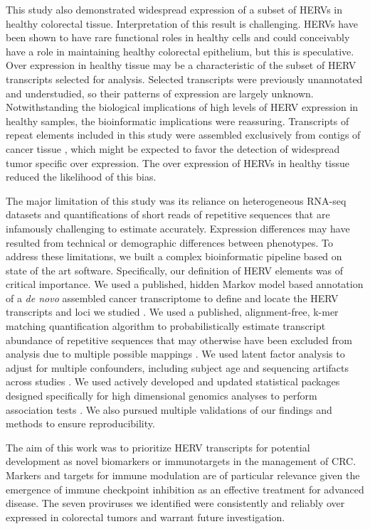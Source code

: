 This study also demonstrated widespread expression of a subset of HERVs in healthy colorectal tissue.
Interpretation of this result is challenging.
HERVs have been shown to have rare functional roles in healthy cells \citep{Rote2004} and could conceivably have a role in maintaining healthy colorectal epithelium, but this is speculative.
Over expression in healthy tissue may be a characteristic of the subset of HERV transcripts selected for analysis.
Selected transcripts were previously unannotated and understudied, so their patterns of expression are largely unknown.
Notwithstanding the biological implications of high levels of HERV expression in healthy samples, the bioinformatic implications were reassuring.
Transcripts of repeat elements included in this study were assembled exclusively from contigs of cancer tissue \citep{Attig2019}, which might be expected to favor the detection of widespread tumor specific over expression.
The over expression of HERVs in healthy tissue reduced the likelihood of this bias.

The major limitation of this study was its reliance on heterogeneous RNA-seq datasets and quantifications of short reads of repetitive sequences that are infamously challenging to estimate accurately.
Expression differences may have resulted from technical or demographic differences between phenotypes.
To address these limitations, we built a complex bioinformatic pipeline based on state of the art software.
Specifically, our definition of HERV elements was of critical importance.
We used a published, hidden Markov model based annotation of a \emph{de novo} assembled cancer transcriptome to define and locate the HERV transcripts and loci we studied \citep{Attig2019}.
We used a published, alignment-free, k-mer matching quantification algorithm to probabilistically estimate transcript abundance of repetitive sequences that may otherwise have been excluded from analysis due to multiple possible mappings \citep{Patro2017}.
We used latent factor analysis to adjust for multiple confounders, including subject age and sequencing artifacts across studies \citep{sva}.
We used actively developed and updated statistical packages designed specifically for high dimensional genomics analyses to perform association tests \citep{Love2014, sva}.
We also pursued multiple validations of our findings and methods to ensure reproducibility.

The aim of this work was to prioritize HERV transcripts for potential development as novel biomarkers or immunotargets in the management of CRC.
Markers and targets for immune modulation are of particular relevance given the emergence of immune checkpoint inhibition as an effective treatment for advanced disease.
The seven proviruses we identified were consistently and reliably over expressed in colorectal tumors and warrant future investigation.
